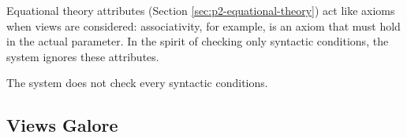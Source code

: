 \documentclass[a4paper]{memoir}
\begin{document}
\begin{warning}
  Equational theory attributes (Section \ref{sec:p2-equational-theory})
  act like axioms when views are considered: associativity, for example,
  is an axiom that must hold in the actual parameter.
  In the spirit of checking only syntactic conditions, the system
  ignores these attributes.
\end{warning}

\begin{warning}
  The system does not check every syntactic conditions.
\end{warning}

\subsection{Views Galore}\label{sec:p2-views-exs}
\end{document}
